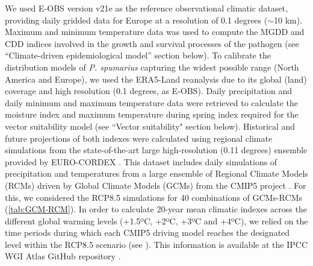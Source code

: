 We used E-OBS version v21e \cite{cornes_ensemble_2018} as the reference
observational climatic dataset, providing daily gridded data for Europe at a
resolution of 0.1 degrees ($\sim$10 km). Maximum and minimum temperature data
was used to compute the MGDD and CDD indices involved in the growth and
survival processes of the \xf{} pathogen (see ``Climate-driven epidemiological
model'' section below). To calibrate the distribution models of \textit{P.
    spumarius} capturing the widest possible range (North America and Europe),
we
used the ERA5-Land reanalysis
\cite{munoz-sabater_era5-land_2021} due to its global (land) coverage and
high resolution (0.1 degrees, as E-OBS). Daily precipitation and daily minimum
and maximum temperature data were retrieved to calculate the moisture index and
maximum temperature during spring index required for the vector suitability
model (see ``Vector suitability" section below).
Historical and future projections of both indexes were calculated using
regional climate simulations from the state-of-the-art large high-resolution
(0.11 degrees) ensemble provided by EURO-CORDEX \cite{giorgi_regional_2015}.
This dataset includes daily simulations of precipitation and temperatures from
a large ensemble of Regional Climate Models (RCMs) driven by Global Climate
Models (GCMs) from the CMIP5 project \cite{Taylor_2011}. For this, we
considered the RCP8.5 simulations for 40 combinations of GCMs-RCMs
(\cref{tab:GCM-RCM}). In order to calculate 20-year mean climatic indexes
across the different global warming levels (+1.5ºC, +2ºC, +3ºC and +4ºC), we
relied on the time periods during which each CMIP5 driving model reaches the
designated level within the RCP8.5 scenario (see
\cite{diez-sierra_consistency_2023}). This information is available at the IPCC
WGI Atlas GitHub repository \cite{iturbide_repository_2021}.

